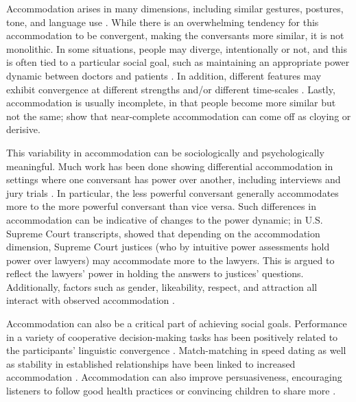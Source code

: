 \documentclass{acm_proc_article-sp}
\begin{document}
Accommodation arises in many dimensions, including similar gestures, postures, tone, and language use \cite{CondonOgston1967,BourhisGiles1977,GilesEtAl1979,LeveltKeller1982,HaleBurgoon1984,ChartrandvanBaaren2009}. While there is an overwhelming tendency for this accommodation to be convergent, making the conversants more similar, it is not monolithic.  In some situations, people may diverge, intentionally or not, and this is often tied to a particular social goal, such as maintaining an appropriate power dynamic between doctors and patients \cite{Ferrara1991}.  In addition, different features may exhibit convergence at different strengths \cite{ThakererEtAl1982,BilousKrauss1988,DNMGamonDumais2011} and/or different time-scales \cite{Ferrara1991}.  Lastly, accommodation is usually incomplete, in that people become more similar but not the same; \cite{GilesCouplandCoupland1991,GilesSmith1979} show that near-complete accommodation can come off as cloying or derisive.

This variability in accommodation can be sociologically and psychologically meaningful.  Much work has been done showing differential accommodation in settings where one conversant has power over another, including interviews and jury trials \cite{WillemynsEtAl1997,Gnisci2005,DNMEtAl2012}. In particular, the less powerful conversant generally accommodates more to the more powerful conversant than vice versa. Such differences in accommodation can be indicative of changes to the power dynamic; in U.S. Supreme Court transcripts, \cite{BayesianEchoChamber} showed that depending on the accommodation dimension, Supreme Court justices (who by intuitive power assessments hold power over lawyers) may accommodate more to the lawyers.  This is argued to reflect the lawyers' power in holding the answers to justices' questions.  Additionally, factors such as gender, likeability, respect, and attraction all interact with observed accommodation \cite{IrelandEtAl2011,Natale1975}.

Accommodation can also be a critical part of achieving social goals.  Performance in a variety of cooperative decision-making tasks has been positively related to the participants' linguistic convergence \cite{Clark?,FusaroliEtAl2012,MinortityMajority?}.  Match-matching in speed dating as well as stability in established relationships have been linked to increased accommodation \cite{IrelandEtAl2011}.  Accommodation can also improve persuasiveness, encouraging listeners to follow good health practices \cite{KlineCeropski1984} or convincing children to share more \cite{BurlesonFennelly1981}.
\end{document}

